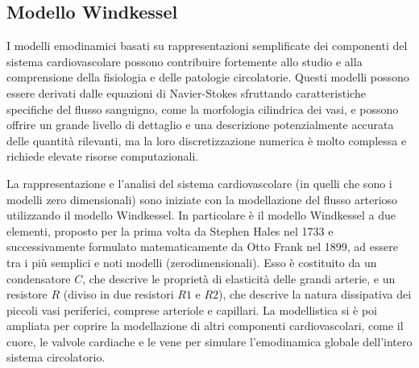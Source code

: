\newpage

\subsection{Modello Windkessel}

I modelli emodinamici basati su rappresentazioni semplificate dei componenti del sistema cardiovascolare possono contribuire fortemente allo studio e alla comprensione della fisiologia e delle patologie circolatorie. 
Questi modelli possono essere derivati dalle equazioni di Navier-Stokes sfruttando caratteristiche specifiche del flusso sanguigno, come la morfologia cilindrica dei vasi, e possono offrire un grande livello di dettaglio e una descrizione potenzialmente accurata delle quantità rilevanti, ma la loro discretizzazione numerica è molto complessa e richiede elevate risorse computazionali.

La rappresentazione e l'analisi del sistema cardiovascolare (in quelli che sono i modelli zero dimensionali) sono iniziate con la modellazione del flusso arterioso utilizzando il modello Windkessel. In particolare è il modello Windkessel a due elementi, proposto per la prima volta da Stephen Hales nel 1733 e successivamente formulato matematicamente da Otto Frank nel 1899, ad essere tra i più semplici e noti modelli (zerodimensionali). Esso è costituito da un condensatore $C$, che descrive le proprietà di elasticità delle grandi arterie, e un resistore $R$ (diviso in due resistori $R1$ e $R2$), che descrive la natura dissipativa dei piccoli vasi periferici, comprese arteriole e capillari. La modellistica si è poi ampliata per coprire la modellazione di altri componenti cardiovascolari, come il cuore, le valvole cardiache e le vene per simulare l'emodinamica globale dell'intero sistema circolatorio.


